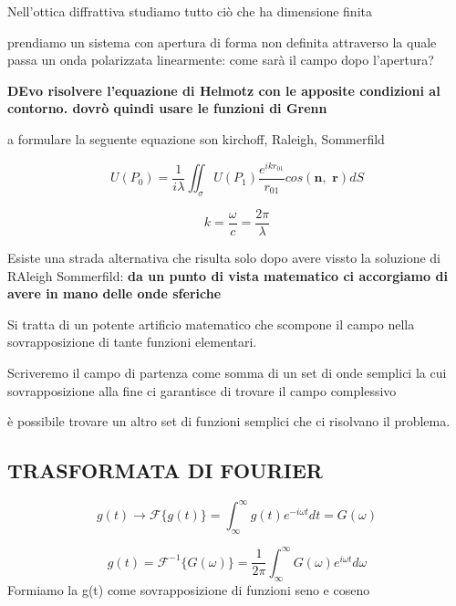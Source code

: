 \documentclass{article}
\begin{document}
Nell'ottica diffrattiva studiamo tutto ciò che ha dimensione finita 



prendiamo un sistema con apertura di forma non definita attraverso la quale passa un onda polarizzata linearmente: come sarà il campo dopo l'apertura?

\textbf{DEvo risolvere l'equazione di Helmotz con le apposite condizioni al contorno. dovrò quindi usare le funzioni di Grenn} 



a formulare la seguente equazione son kirchoff, Raleigh, Sommerfild

\begin{equation}
U(P_{0}) = \frac{1}{i\lambda} \iint_\sigma U(P_{1}) \frac{e^{i k r_{01}}}{r_{01}} cos(\textbf{n} , \textbf{ r})dS
\end{equation}

\begin{equation}
k=\frac{\omega}{c}  = \frac{2\pi}{\lambda}
\end{equation}

Esiste una strada alternativa che risulta solo dopo avere vissto la soluzione di RAleigh Sommerfild: \textbf{da un punto di vista matematico ci accorgiamo di avere in mano delle onde sferiche}

Si tratta di un potente artificio matematico che scompone il campo nella sovrapposizione di tante funzioni elementari.

Scriveremo il campo di partenza come somma di un set di onde semplici la cui sovrapposizione alla fine ci garantisce di trovare il campo complessivo

 
è possibile trovare un altro set di funzioni semplici che ci risolvano il problema.

\subsection{TRASFORMATA DI FOURIER}

	

\begin{equation}
g(t) \longrightarrow\mathscr{F} 	 \{g(t)\} =\int_{\infty}^{\infty} g(t) e^{-i\omega t}dt =G(\omega)
\end{equation}


	
\begin{equation}
g(t)= \mathscr{F}^{-1} 	 \{G(\omega)\} =\frac{1}{2\pi}\int_{\infty}^{\infty} G(\omega) e^{i\omega t}d\omega
\end{equation}
Formiamo la g(t) come sovrapposizione di funzioni seno e coseno
\end{document}
